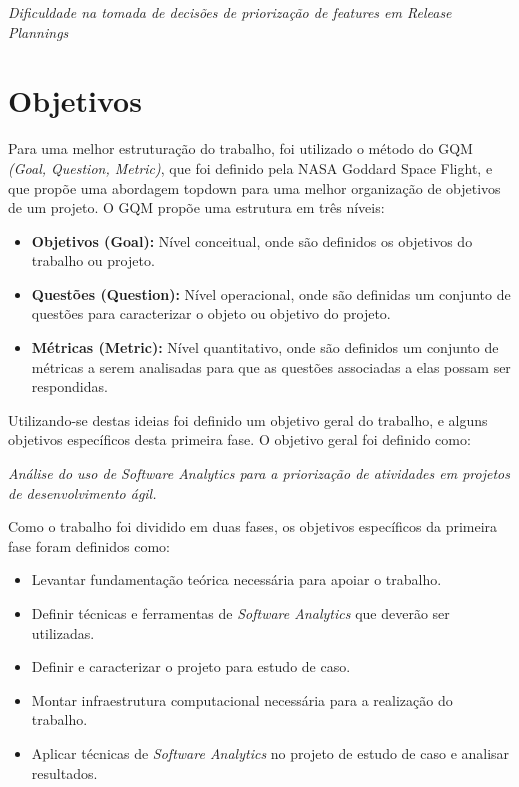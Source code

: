 \begin{center}
 \textit{Dificuldade na tomada de decisões de priorização de features em
  Release Plannings}
\end{center}

\section{Objetivos}

Para uma melhor estruturação do trabalho, foi utilizado o método do
GQM \textit{(Goal, Question, Metric)}, que foi definido pela NASA Goddard Space
Flight, e que propõe uma abordagem topdown para uma melhor organização de objetivos
de um projeto. O GQM propõe uma estrutura em três níveis\cite{gqm}:

\begin{itemize}
    \item \textbf{Objetivos (Goal):} Nível conceitual, onde são definidos os
        objetivos do trabalho ou projeto.
    \item \textbf{Questões (Question):} Nível operacional, onde são definidas um
        conjunto de questões para caracterizar o objeto ou objetivo do projeto.
    \item \textbf{Métricas (Metric):} Nível quantitativo, onde são definidos um
        conjunto de métricas a serem analisadas para que as questões associadas
        a elas possam ser respondidas.
\end{itemize}

Utilizando-se destas ideias foi definido um objetivo geral do trabalho, e alguns
objetivos específicos desta primeira fase. O objetivo geral foi definido como:

\begin{center}
    \textit{Análise do uso de Software Analytics para a priorização
        de atividades em projetos de desenvolvimento ágil.}
\end{center}

Como o trabalho foi dividido em duas fases, os objetivos específicos da primeira
fase foram definidos como:

\begin{itemize}
    \item Levantar fundamentação teórica necessária para apoiar o trabalho.
    \item Definir técnicas e ferramentas de \textit{Software Analytics} que deverão ser utilizadas.
    \item Definir e caracterizar o projeto para estudo de caso.
    \item Montar infraestrutura computacional necessária para a realização do trabalho.
    \item Aplicar técnicas de \textit{Software Analytics} no projeto de estudo de caso e analisar resultados.
\end{itemize}

